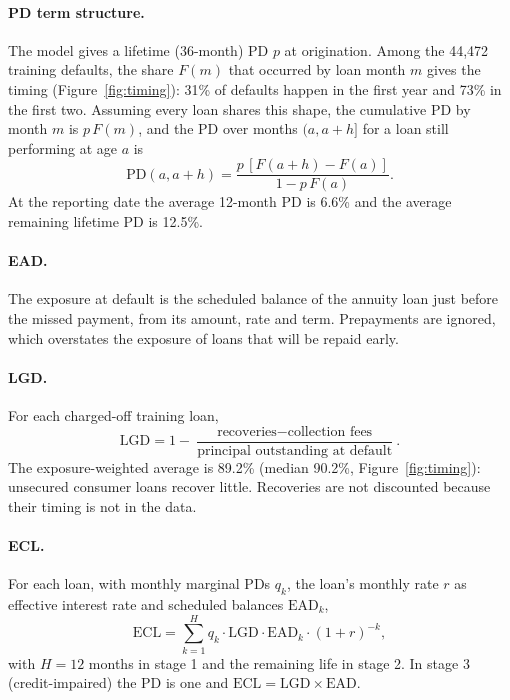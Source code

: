 \documentclass[11pt,a4paper]{article}
\begin{document}
\paragraph{PD term structure.} The model gives a lifetime (36-month) PD $p$ at origination. Among the 44{,}472 training defaults, the share $F(m)$ that occurred by loan month $m$ gives the timing (Figure~\ref{fig:timing}): 31\% of defaults happen in the first year and 73\% in the first two. Assuming every loan shares this shape, the cumulative PD by month $m$ is $p\,F(m)$, and the PD over months $(a, a+h]$ for a loan still performing at age $a$ is
\begin{equation}
\mathrm{PD}(a, a+h) = \frac{p\,[F(a+h) - F(a)]}{1 - p\,F(a)}.
\end{equation}
At the reporting date the average 12-month PD is 6.6\% and the average remaining lifetime PD is 12.5\%.

\paragraph{EAD.} The exposure at default is the scheduled balance of the annuity loan just before the missed payment, from its amount, rate and term. Prepayments are ignored, which overstates the exposure of loans that will be repaid early.

\paragraph{LGD.} For each charged-off training loan,
\begin{equation*}
\mathrm{LGD} = 1 - \frac{\text{recoveries} - \text{collection fees}}{\text{principal outstanding at default}}.
\end{equation*}
 The exposure-weighted average is 89.2\% (median 90.2\%, Figure~\ref{fig:timing}): unsecured consumer loans recover little. Recoveries are not discounted because their timing is not in the data.

\paragraph{ECL.} For each loan, with monthly marginal PDs $q_k$, the loan's monthly rate $r$ as effective interest rate and scheduled balances $\mathrm{EAD}_k$,
\begin{equation}
\mathrm{ECL} = \sum_{k=1}^{H} q_k \cdot \mathrm{LGD} \cdot \mathrm{EAD}_k \cdot (1+r)^{-k},
\end{equation}
with $H = 12$ months in stage 1 and the remaining life in stage 2. In stage 3 (credit-impaired) the PD is one and $\mathrm{ECL} = \mathrm{LGD} \times \mathrm{EAD}$.
\end{document}
